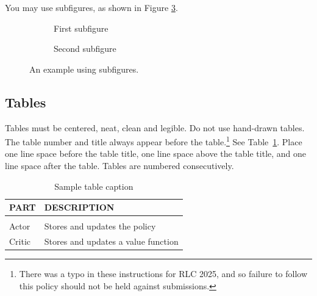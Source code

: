 \documentclass[10pt]{article} %
\theoremstyle{plain}
\theoremstyle{definition}
\theoremstyle{remark}
\begin{document}
You may use subfigures, as shown in Figure \ref{fig:subfigureExample}.

\begin{figure}[htbp]
    \centering
    \begin{subfigure}[b]{0.45\textwidth}
        \centering
        \fbox{\rule[-.5cm]{0cm}{4cm} \rule[-.5cm]{4cm}{0cm}} %
        \caption{First subfigure}
        \label{fig:sub1}
    \end{subfigure}
    \hfill
    \begin{subfigure}[b]{0.45\textwidth}
        \centering
        \fbox{\rule[-.5cm]{0cm}{4cm} \rule[-.5cm]{4cm}{0cm}} %
        \caption{Second subfigure}
        \label{fig:sub2}
    \end{subfigure}
    \caption{An example using subfigures.}
    \label{fig:subfigureExample}
\end{figure}

\subsection{Tables}
\label{sec:tables}
Tables must be centered, neat, clean and legible. Do not use hand-drawn tables. The table number and title always appear before the table.\footnote{There was a typo in these instructions for RLC 2025, and so failure to follow this policy should not be held against submissions.} See Table~\ref{tab:exampleTable}. Place one line space before the table title, one line space above the table title, and one line space after the table. Tables are numbered consecutively.

\begin{table}[htbp]
    \caption{Sample table caption}
    \begin{center}
        \begin{tabular}{ll}
            \multicolumn{1}{l}{\bf PART}  &\multicolumn{1}{l}{\bf DESCRIPTION}
            \\ \hline \\
            Actor         &Stores and updates the policy \\
            Critic        &Stores and updates a value function \\
        \end{tabular}
    \end{center}
    \label{tab:exampleTable}
\end{table}
\end{document}
